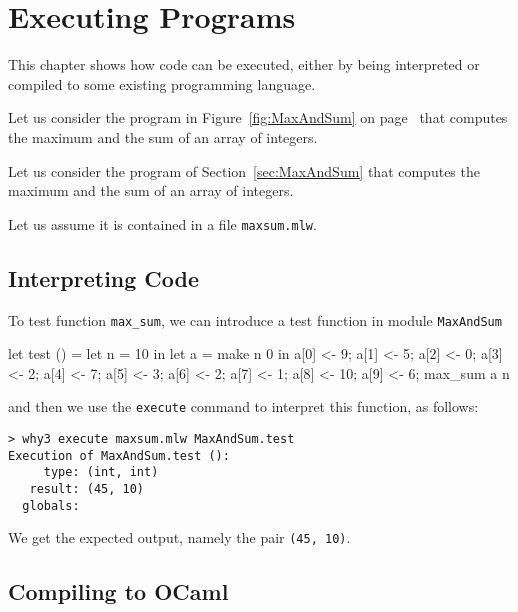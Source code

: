 
\chapter{Executing \whyml Programs}
\label{chap:exec}

This chapter shows how \whyml code can be executed, either by being
interpreted or compiled to some existing programming language.

\begin{latexonly}
Let us consider the program in Figure~\ref{fig:MaxAndSum}
on page~\pageref{fig:MaxAndSum} that computes the maximum and the sum
of an array of integers.
\end{latexonly}
\begin{htmlonly}
Let us consider the program of Section~\ref{sec:MaxAndSum} that computes
the maximum and the sum of an array of integers.
\end{htmlonly}
Let us assume it is contained in a file \texttt{maxsum.mlw}.

\section{Interpreting \whyml Code}
\label{sec:execute}

To test function \texttt{max\_sum}, we can introduce a \whyml test function
in module \texttt{MaxAndSum}
\begin{whycode}
  let test () =
    let n = 10 in
    let a = make n 0 in
    a[0] <- 9; a[1] <- 5; a[2] <- 0; a[3] <- 2;  a[4] <- 7;
    a[5] <- 3; a[6] <- 2; a[7] <- 1; a[8] <- 10; a[9] <- 6;
    max_sum a n
\end{whycode}
and then we use the \texttt{execute} command to interpret this function,
as follows:
\begin{verbatim}
> why3 execute maxsum.mlw MaxAndSum.test
Execution of MaxAndSum.test ():
     type: (int, int)
   result: (45, 10)
  globals:
\end{verbatim}
We get the expected output, namely the pair \texttt{(45, 10)}.

\section{Compiling \whyml to OCaml}
\label{sec:extract}

